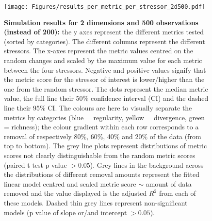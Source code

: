 \documentclass[12pt,letterpaper]{article}
\begin{document}
\begin{figure}[!htbp]
\centering
   \texttt{[image: Figures/results\_per\_metric\_per\_stressor\_2d500.pdf]}
\caption{\scriptsize{\textbf{Simulation results for 2 dimensions and 500 observations (instead of 200):} the y axes represent the different metrics tested (sorted by categories).
The different columns represent the different stressors. The x-axes represent the metric values centred on the random changes and scaled by the maximum value for each metric between the four stressors.
Negative and positive values signify that the metric score for the stressor of interest is lower/higher than the one from the random stressor.
The dots represent the median metric value, the full line their 50\% confidence interval (CI) and the dashed line their 95\% CI.
The colours are here to visually separate the metrics by categories (blue = regularity, yellow = divergence, green = richness); the colour gradient within each row corresponds to a removal of respectively 80\%, 60\%, 40\% and 20\% of the data (from top to bottom).
The grey line plots represent distributions of metric scores not clearly distinguishable from the random metric scores (paired t-test p value $> 0.05$).
Grey lines in the background across the distributions of different removal amounts represent the fitted linear model centred and scaled metric score $\sim$ amount of data removed and the value displayed is the adjusted $R^2$ from each of these models.
Dashed thin grey lines represent non-significant models (p value of slope or/and intercept $> 0.05$).
}}
\label{Fig:simulation_results_2d500}
\end{figure}
\bigskip
\end{document}
